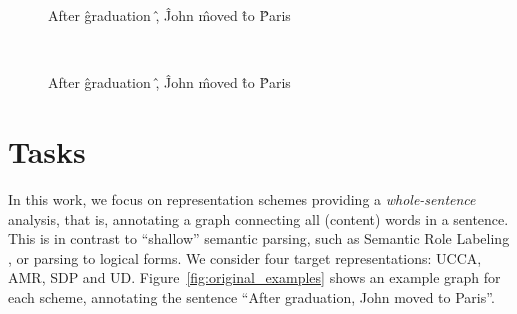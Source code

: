 \documentclass[11pt,a4paper]{article}
\begin{document}
\begin{figure*}
\begin{subfigure}[t]{0.5\textwidth}
	\begin{dependency}[text only label, label style={above}, font=\small]
	\begin{deptext}[column sep=.1em,ampersand replacement=\^]
	After \^ graduation \^ , \^ John \^ moved \^ to \^ Paris \\
	\end{deptext}
	\end{dependency}
  \label{fig:original_example_sdp}
\end{subfigure}
~
\begin{subfigure}[t]{0.5\textwidth}
	\begin{dependency}[text only label, label style={above}, font=\small]
	\begin{deptext}[column sep=.1em,ampersand replacement=\^]
	After \^ graduation \^ , \^ John \^ moved \^ to \^ Paris \\
	\end{deptext}
	\end{dependency}
  \label{fig:original_example_ud}
\end{subfigure}

\caption{Example for each representation scheme whose parsing task we handle.}
\label{fig:original_examples}
\end{figure*}

\section{Tasks}\label{sec:tasks}

In this work, we focus on representation schemes providing a \textit{whole-sentence} analysis,
that is, annotating a graph connecting all (content) words in a sentence.
This is in contrast to ``shallow'' semantic parsing,
such as Semantic Role Labeling
\cite[SRL;][]{Palmer:05,gildea2002automatic,swayamdipta2017frame,ringgaard2017sling},
or parsing to logical forms.
We consider four target representations: UCCA, AMR, SDP and UD.
Figure~\ref{fig:original_examples} shows an example graph for each scheme,
annotating the sentence ``After graduation, John moved to Paris''.
\end{document}
